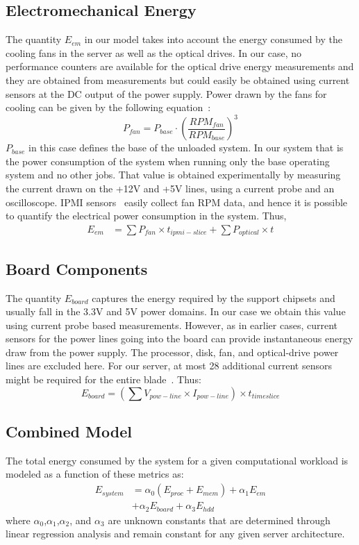 \documentclass[times, 10pt, finalversion]{usetex-v1}
\begin{document}
\subsection{Electromechanical Energy}
\label{sec:electrical}
The quantity $E_{em}$ in our model takes into account the energy
consumed by the cooling fans in the server as well
as the optical drives. In our case, no performance counters are available for
the optical drive energy measurements and 
they are obtained from measurements but could easily be
obtained using current sensors at the DC output
of the power supply. Power drawn by the fans for cooling can be given
by the following equation~\cite{Bieier1997}:
\begin{equation}
\label{eq:fanp}
P_{fan}=  P_{base} \cdot \left(\frac{RPM_{fan}}{RPM_{base}} \right)^3
\end{equation}
$P_{base}$ in this case defines the base of the unloaded system. In our
system that is the power consumption of the system when running only the
base operating system and no other jobs. That value is obtained
experimentally by measuring the current drawn on the +12V and +5V lines,
using a current probe and an oscilloscope. IPMI sensors~\cite{Intel2004}
easily collect fan RPM data, and hence it is possible to quantify the
electrical power consumption in the system. Thus,
\begin{align}
\label{eqn:fanpwr}
E_{em}& = \sum P_{fan}\times t_{ipmi-slice}  + \sum P_{optical}\times t
\end{align}
\subsection{Board Components}
\label{sec:board}
The quantity $E_{board}$ captures the energy required by the support
chipsets and usually fall in the 3.3V and 5V power
domains. In our case we obtain this value using current probe based
measurements. However, as in earlier cases, current
sensors for the power lines going into the board can provide
instantaneous energy draw from the power supply. The processor,
disk, fan, and optical-drive power lines are excluded here. For our
server, at most 28 additional current sensors might be required for
the entire blade~\cite{SSI2004}. Thus:
\begin{equation}
\label{eqn:board}
E_{board} = \left(\sum V_{pow-line}\times I_{pow-line}\right) \times t_{timeslice}
\end{equation}
\subsection{Combined Model}
\label{sec:wholemodel}
The total energy consumed by the system for a given computational
workload is 
modeled as a function of these metrics as:
\begin{align}
\label{eq:linmodel}
E_{system} &=  \alpha_0 (E_{proc} + E_{mem}) + \alpha_1 E_{em} \nonumber \\
&+ \alpha_2 E_{board} + \alpha_3 E_{hdd}
\end{align}
where $\alpha_{0}$,$\alpha_{1}$,$\alpha_{2}$, and $\alpha_{3}$ are unknown
constants that are determined through linear regression analysis and
remain constant for any given server architecture.
\end{document}
